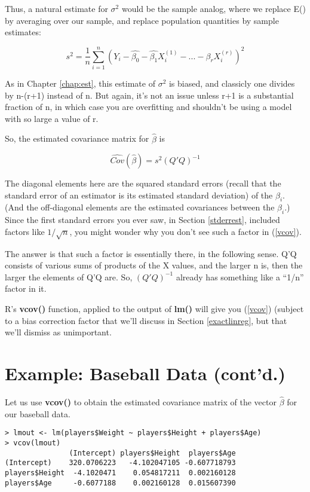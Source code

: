 Thus, a natural estimate for $\sigma^2$ would be the sample analog,
where we replace E() by averaging over our sample, and replace
population quantities by sample estimates:

\begin{equation}
s^2 = \frac{1}{n} \sum_{i=1}^{n} 
(Y_i - \hat{\beta_0} - \hat{\beta_1} X_i^{(1)} - ...
- \hat{\beta_r} X_i^{(r)})^2 
\end{equation}

As in Chapter \ref{chap:est}, this estimate of $\sigma^2$ is biased, and
classicly one divides by n-(r+1) instead of n.  But again, it's not an
issue unless r+1 is a substantial fraction of n, in which case you are
overfitting and shouldn't be using a model with so large a value of r.

So, the estimated covariance matrix for $\hat{\beta}$ is

\begin{equation}
\label{vcov}
\widehat{Cov}(\hat{\beta}) = s^2 (Q'Q)^{-1} 
\end{equation}

The diagonal elements here are the squared standard errors (recall that
the standard error of an estimator is its estimated standard deviation)
of the $\beta_i$.  (And the off-diagonal elements are the estimated
covariances between the $\beta_i$.)  Since the first standard errors you
ever saw, in Section \ref{stderrest}, included factors like
$1/\sqrt{n}$, you might wonder why you don't see such a factor in
(\ref{vcov}).

The answer is that such a factor is essentially there, in the following
sense.  Q'Q consists of various sums of products of the X values, and
the larger n is, then the larger the elements of Q'Q are. So,
$(Q'Q)^{-1}$ already has something like a ``1/n'' factor in it.

R's {\bf vcov()} function, applied to the output of {\bf lm()} will give
you (\ref{vcov}) (subject to a bias correction factor that we'll discuss
in Section \ref{exactlinreg}, but that we'll dismiss as unimportant.

\section{Example:  Baseball Data (cont'd.)}

Let us use {\bf vcov()} to obtain the estimated covariance
matrix of the vector $\widehat{\beta}$ for our baseball data.

\begin{lstlisting}
> lmout <- lm(players$Weight ~ players$Height + players$Age)
> vcov(lmout)
               (Intercept) players$Height  players$Age
(Intercept)    320.0706223   -4.102047105 -0.607718793
players$Height  -4.1020471    0.054817211  0.002160128
players$Age     -0.6077188    0.002160128  0.015607390
\end{lstlisting}

